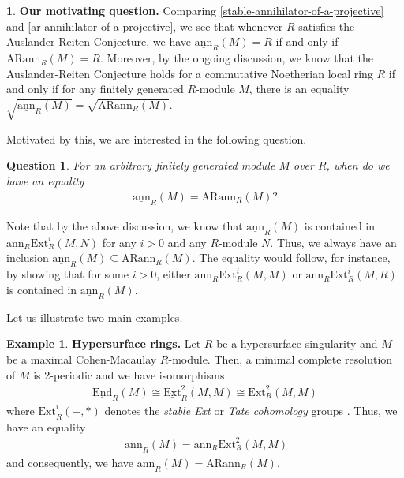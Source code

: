 \documentclass[12pt]{amsart}
\newcommand{\Ext}{\mathrm{Ext}}
\newcommand{\sExt}{\underline{\mathrm{Ext}}}
\newcommand{\sEnd}{\underline{\mathrm{End}}}
\newcommand{\ann}{\mathrm{ann}}
\newcommand{\sann}{\underline{\mathrm{ann}}}
\newcommand{\arann}{\mathrm{ARann}}
\newtheorem{question}[theorem]{Question}
\theoremstyle{definition}
\newtheorem{example}[theorem]{Example}
\newtheorem{chunk}[theorem]{}
\numberwithin{equation}{theorem}
\begin{document}
\begin{chunk}
    \textbf{Our motivating question.} 
    Comparing \ref{stable-annihilator-of-a-projective} and \ref{ar-annihilator-of-a-projective}, we see that whenever $R$ satisfies the Auslander-Reiten Conjecture, we have $\sann_R(M) = R$ if and only if $\arann_R(M) = R$. Moreover, by the ongoing discussion, we know that the Auslander-Reiten Conjecture holds for a commutative Noetherian local ring $R$ if and only if for any finitely generated $R$-module $M$, there is an equality $\sqrt{\sann_R(M)} = \sqrt{\arann_R(M)}$.
    

    Motivated by this, we are interested in the following question.
    \begin{question}\label{main-question-1}
        For an arbitrary finitely generated module $M$ over $R$, when do we have an equality
        \begin{align*}
            \sann_R (M) = \arann_R(M)?
        \end{align*}
    \end{question}
    Note that by the above discussion, we know that $\sann_R(M)$ is contained in $\ann_R\Ext_R^i(M, N)$ for any $i > 0$ and any $R$-module $N$. Thus, we always have an inclusion $\sann_R(M) \subseteq \arann_R(M)$. The equality would follow, for instance, by showing that for some $i > 0$, either $\ann_R\Ext_R^i(M,M)$ or $\ann_R\Ext_R^i(M,R)$ is contained in $\sann_R(M)$.


    
    
    
    Let us illustrate two main examples.
    \begin{example}\label{hypersurface-example}
        \textbf{Hypersurface rings.}
        Let $R$ be a hypersurface singularity and $M$ be a maximal Cohen-Macaulay $R$-module. Then, a minimal complete resolution of $M$ is 2-periodic \cite{Eisenbud} and we have isomorphisms
        \begin{align*}
            \sEnd_R(M) \cong \sExt_R^2(M,M) \cong \Ext_R^2(M,M)
        \end{align*}
        where $\sExt_R^i(-,*)$ denotes the \textit{stable Ext} or \textit{Tate cohomology} groups \cite{Buchweitz}. Thus, we have an equality
        \begin{align*}\
            \sann_R (M) = \ann_R\Ext_R^2(M,M)
        \end{align*}
        and consequently, we have $\sann_R(M) = \arann_R(M)$.
    \end{example}


\end{chunk}
\end{document}
